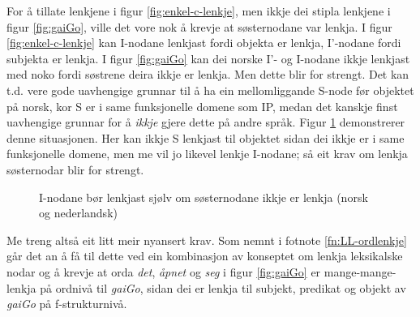 \documentclass[12pt,a4paper,oneside,draft]{report}
\newcommand{\proj}[2]{\begin{tabular}{c}\footnotesize{#1}\\\normalsize{#2}\end{tabular}}
\newcommand{\ua}{\ensuremath{\uparrow}}
\newcommand{\da}{\ensuremath{\downarrow}}
\begin{document}
For å tillate lenkjene i figur \ref{fig:enkel-c-lenkje}, men ikkje dei
 stipla lenkjene i figur \ref{fig:gaiGo}, ville det vore nok å krevje
 at søsternodane var lenkja. I figur \ref{fig:enkel-c-lenkje} kan
 I-nodane lenkjast fordi objekta er lenkja, I'-nodane fordi subjekta
 er lenkja. I figur \ref{fig:gaiGo} kan dei norske I'- og I-nodane
 ikkje lenkjast med noko fordi søstrene deira ikkje er lenkja.  Men
 dette blir for strengt. Det kan t.d. vere gode uavhengige grunnar til
 å ha ein mellomliggande S-node før objektet på norsk, kor S er i same
 funksjonelle domene som IP, medan det kanskje finst uavhengige
 grunnar for å \emph{ikkje} gjere dette på andre språk. Figur
 \ref{fig:enkel-c-lenkje-med-S} demonstrerer denne situasjonen. Her
 kan ikkje S lenkjast til objektet sidan dei ikkje er i same
 funksjonelle domene, men me vil jo likevel lenkje I-nodane; så eit
 krav om lenkja søsternodar blir for strengt.

\begin{figure}[htp]
\centering
   \caption{I-nodane bør lenkjast sjølv om søsternodane ikkje er
   lenkja (norsk og nederlandsk)}
   \label{fig:enkel-c-lenkje-med-S}
  \end{figure}

Me treng altså eit litt meir nyansert krav. Som nemnt i fotnote
\ref{fn:LL-ordlenkje} går det an å få til dette ved ein kombinasjon av
konseptet om lenkja leksikalske nodar og å krevje at orda \emph{det},
 \emph{åpnet} og \emph{seg} i figur \ref{fig:gaiGo} er mange-mange-lenkja på
ordnivå til \emph{gaiGo}, sidan dei er lenkja til subjekt, predikat og
objekt av \emph{gaiGo} på f\hyp{}strukturnivå. 
\end{document}
